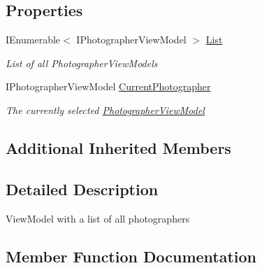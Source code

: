 \subsection*{Properties}
\begin{DoxyCompactItemize}
\item 
I\+Enumerable$<$ I\+Photographer\+View\+Model $>$ \mbox{\hyperlink{class_pic_d_b_1_1_view_models_1_1_photographer_list_view_model_a36cb7ad6f5651e2dde70dc3e9c136808}{List}}
\begin{DoxyCompactList}\small\item\em List of all Photographer\+View\+Models \end{DoxyCompactList}\item 
I\+Photographer\+View\+Model \mbox{\hyperlink{class_pic_d_b_1_1_view_models_1_1_photographer_list_view_model_a0d1b8d5640a19a39e294f5a770ee57bf}{Current\+Photographer}}
\begin{DoxyCompactList}\small\item\em The currently selected \mbox{\hyperlink{class_pic_d_b_1_1_view_models_1_1_photographer_view_model}{Photographer\+View\+Model}} \end{DoxyCompactList}\end{DoxyCompactItemize}
\subsection*{Additional Inherited Members}


\subsection{Detailed Description}
View\+Model with a list of all photographers 



\subsection{Member Function Documentation}
\mbox{\label{class_pic_d_b_1_1_view_models_1_1_photographer_list_view_model_aabaf179c4aa8ae8146a33eca6227c2f5}} 
